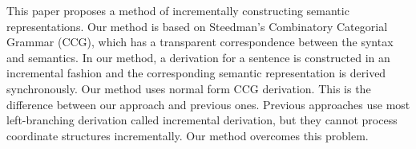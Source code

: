 This paper proposes a method of incrementally constructing semantic representations. Our method is based on Steedman's Combinatory Categorial Grammar (CCG), which has a transparent correspondence between the syntax and semantics. In our method, a derivation for a sentence is constructed in an incremental fashion and the corresponding semantic representation is derived synchronously. Our method uses normal form CCG derivation. This is the difference between our approach and previous ones. Previous approaches use most left-branching derivation called incremental derivation, but they cannot process coordinate structures incrementally. Our method overcomes this problem.
